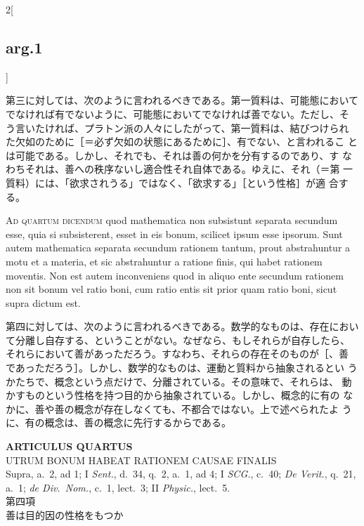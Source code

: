 \documentclass[paper=a4paper,fontsize=10pt,jafontsize=9pt,titlepage]{jlreq}
\begin{document}
\begin{paracol}{2}[\subsection{arg.1}]
\switchcolumn

第三に対しては、次のように言われるべきである。第一質料は、可能態において
 でなければ有でないように、可能態においてでなければ善でない。ただし、そ
 う言いたければ、プラトン派の人々にしたがって、第一質料は、結びつけられ
 た欠如のために［＝必ず欠如の状態にあるために］、有でない、と言われるこ
 とは可能である。しかし、それでも、それは善の何かを分有するのであり、す
 なわちそれは、善への秩序ないし適合性それ自体である。ゆえに、それ（＝第
 一質料）には、「欲求されうる」ではなく、「欲求する」［という性格］が適
 合する。

\switchcolumn*[\subsection{ad.4}]

{\scshape Ad quartum dicendum} quod mathematica non subsistunt separata
 secundum esse, quia si subsisterent, esset in eis bonum, scilicet ipsum
 esse ipsorum. Sunt autem mathematica separata secundum rationem tantum,
 prout abstrahuntur a motu et a materia, et sic abstrahuntur a ratione
 finis, qui habet rationem moventis. Non est autem inconveniens quod in
 aliquo ente secundum rationem non sit bonum vel ratio boni, cum ratio
 entis sit prior quam ratio boni, sicut supra dictum est.

\switchcolumn

第四に対しては、次のように言われるべきである。数学的なものは、存在におい
 て分離し自存する、ということがない。なぜなら、もしそれらが自存したら、
 それらにおいて善があっただろう。すなわち、それらの存在そのものが［、善
 であっただろう］。しかし、数学的なものは、運動と質料から抽象されるとい
 うかたちで、概念という点だけで、分離されている。その意味で、それらは、
 動かすものという性格を持つ目的から抽象されている。しかし、概念的に有の
 なかに、善や善の概念が存在しなくても、不都合ではない。上で述べられたよ
 うに、有の概念は、善の概念に先行するからである。

\end{paracol}

\newpage
{}
{}
\setcounter{section}{4}
\setcounter{subsection}{0}

\begin{center}
 {\Large {\bfseries ARTICULUS QUARTUS}}\\
 {\large UTRUM BONUM HABEAT RATIONEM CAUSAE FINALIS}\\
 {\footnotesize Supra, a.~2, ad 1; I {\itshape Sent.}, d.~34, q.~2,
 a.~1, ad 4; I {\itshape SCG.}, c.~40; {\itshape De Verit.}, q.~21,
 a.~1; {\itshape de Div.~Nom.}, c.~1, lect.~3; II {\itshape Physic.}, lect.~5.}\\
 {\Large 第四項\\善は目的因の性格をもつか}
\end{center}
\end{document}
